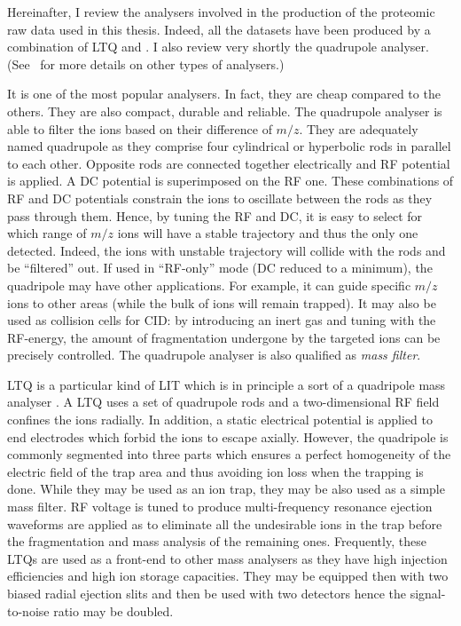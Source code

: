 Hereinafter, I review the analysers involved in the production of the
proteomic raw data used in this thesis. Indeed, all the datasets have been
produced by a combination of \acrfull{LTQ} and \orbi. I also review very
shortly the quadrupole analyser. (See~\cite{Haag2016} for more details on other
types of analysers.)


It is one of the most popular analysers. In fact, they are cheap compared to the
others. They are also compact, durable and reliable. The quadrupole analyser is
able to filter the ions based on their difference of $m/z$. They are adequately
named quadrupole as they comprise four cylindrical or hyperbolic rods in
parallel to each other. Opposite rods are connected together electrically and
\gls{RF} potential is applied. A \gls{DC} potential is superimposed on the
\gls{RF} one. These combinations of \gls{RF} and \gls{DC} potentials constrain the
ions to oscillate between the rods as they pass through them. Hence, by tuning
the \gls{RF} and \gls{DC}, it is easy to select for which range of $m/z$ ions
will have a stable trajectory and thus the only one detected. Indeed, the
ions with unstable trajectory will collide with the rods and be \enquote{filtered}
out. If used in \enquote{\gls{RF}-only} mode (\gls{DC} reduced to a minimum),
the quadripole may have other applications. For example, it can guide specific
$m/z$ ions to other areas (while the bulk of ions will remain trapped).
It may also be used as collision cells for \gls{CID}: by introducing an inert
gas and tuning with the \gls{RF}-energy, the amount of fragmentation undergone
by the targeted ions can be precisely controlled. 
The quadrupole analyser is also qualified as \emph{mass filter}.

\gls{LTQ} is a particular kind of \acrfull{LIT} which is in principle a sort of
a quadripole mass analyser . A \gls{LTQ} uses a set of
quadrupole rods and a two-dimensional \gls{RF} field confines the ions radially.
In addition, a static electrical potential is applied to end electrodes which
forbid the ions to escape axially. However, the quadripole is commonly segmented
into three parts which ensures a perfect homogeneity of the electric field of the
trap area and thus avoiding ion loss when the trapping is done.
While they may be used as an ion trap, they
may be also used as a simple mass filter. \gls{RF} voltage is tuned to produce
multi-frequency resonance ejection waveforms are applied as to
eliminate all the undesirable ions in the trap before the fragmentation and mass
analysis of the remaining ones. Frequently, these \glspl{LTQ} are used as a
front-end to other mass analysers as they have high injection efficiencies and
high ion storage capacities. They may be equipped then with two biased radial
ejection slits and then be used with two detectors hence the signal-to-noise
ratio may be doubled.

